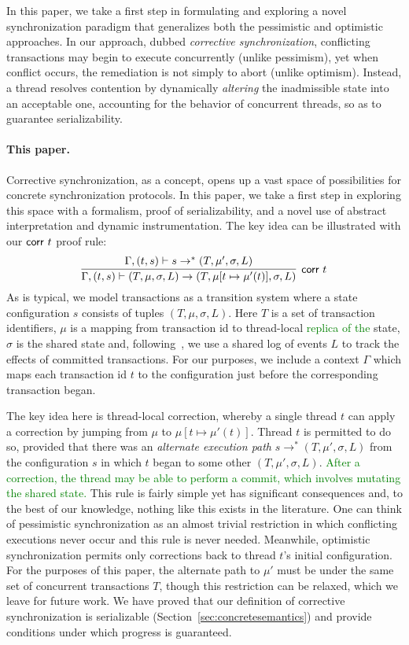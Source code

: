 %
In this paper, we take a first step in formulating and exploring a novel synchronization paradigm that generalizes both the pessimistic and optimistic approaches.
%
In our approach, dubbed \emph{corrective synchronization}, conflicting transactions may begin to execute concurrently (unlike pessimism), yet when conflict occurs, the remediation is not simply to abort (unlike optimism). Instead, a thread resolves contention by dynamically \emph{altering} the inadmissible state into an acceptable one, accounting for the behavior of concurrent threads, so as to guarantee serializability.


\paragraph{This paper.} Corrective synchronization, as a concept, opens up a vast space of possibilities for concrete synchronization protocols. In this paper, we take a first step in exploring this space with a formalism, proof of serializability, and a novel use of abstract interpretation and dynamic instrumentation.
%
The key idea can be illustrated with our ${\sf corr}\ t$ proof rule:
$$
\infer[\text{{\sf corr }} t]{\Gamma, (t,s) \vdash (T, \mu, \sigma, L) \rightarrow (T,\mu[t \mapsto \mu'(t)], \sigma, L)}{
   \Gamma, (t,s) \vdash
	s \rightarrow^{*} (T,\mu', \sigma, L)}
$$
As is typical, we model transactions as a transition system
where a state configuration $s$ consists of tuples $(T,\mu,\sigma,L)$.
Here $T$ is a set of transaction identifiers,  $\mu$ is a mapping from
transaction id to thread-local \textcolor{green}{replica of the} state, $\sigma$ is the shared state
and, following~\cite{KoskinenP15}, we use a shared log of events $L$ to track the
effects of committed transactions.
%
For our purposes, we include a context $\Gamma$ which maps each transaction
id $t$ to the configuration just before the corresponding transaction began.

The key idea here is thread-local correction, whereby a single
thread $t$ can apply a correction by jumping from $\mu$ to
$\mu[t \mapsto \mu'(t)]$. Thread $t$ is permitted to do so,
  provided that there was an \emph{alternate execution path}
  $s \rightarrow^{*} (T,\mu',\sigma,L)$ from the configuration $s$
  in which $t$ began to some other $(T,\mu',\sigma,L)$.
  \textcolor{green}{After a correction, the thread may be able to perform a
    commit, which involves mutating the shared state.}
%
This rule is fairly simple yet has significant consequences and, to
the best of our knowledge, nothing like this exists in the
literature. One can think of pessimistic synchronization as an almost
trivial restriction in which conflicting executions never occur and
this rule is never needed. Meanwhile, optimistic synchronization
permits only corrections back to thread $t$'s initial
configuration.
%
For the purposes of this paper, the alternate path to
$\mu'$ must be under the same set of concurrent transactions $T$,
though this restriction can be relaxed, which we leave for future work.
%
We have proved that our definition of corrective synchronization is serializable
(Section~\ref{sec:concretesemantics}) and provide conditions
under which progress is guaranteed.

